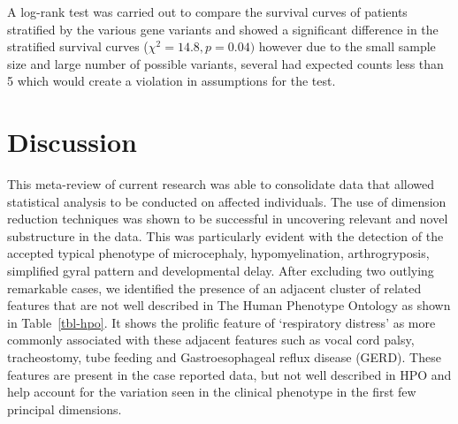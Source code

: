 \documentclass[
  authoryear,
  preprint,
  3p]{elsarticle}
\begin{document}
A log-rank test was carried out to compare the survival curves of
patients stratified by the various gene variants and showed a
significant difference in the stratified survival curves
(\(\chi^2 = 14.8, p = 0.04)\) however due to the small sample size and
large number of possible variants, several had expected counts less than
5 which would create a violation in assumptions for the test.

\hypertarget{discussion}{%
\section{Discussion}\label{discussion}}

This meta-review of current research was able to consolidate data that
allowed statistical analysis to be conducted on affected individuals.
The use of dimension reduction techniques was shown to be successful in
uncovering relevant and novel substructure in the data. This was
particularly evident with the detection of the accepted typical
phenotype of microcephaly, hypomyelination, arthrogryposis, simplified
gyral pattern and developmental delay. After excluding two outlying
remarkable cases, we identified the presence of an adjacent cluster of
related features that are not well described in The Human Phenotype
Ontology \citep{kohler2021human} as shown in Table~\ref{tbl-hpo}. It
shows the prolific feature of `respiratory distress' as more commonly
associated with these adjacent features such as vocal cord palsy,
tracheostomy, tube feeding and Gastroesophageal reflux disease (GERD).
These features are present in the case reported data, but not well
described in HPO and help account for the variation seen in the clinical
phenotype in the first few principal dimensions.
\end{document}
